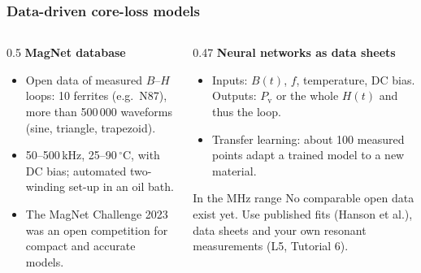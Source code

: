 \begin{frame}
	\frametitle{Data-driven core-loss models}
	\begin{columns}[T]
		\begin{column}{0.5\textwidth}
			\small
			\textbf{MagNet database}
			\begin{itemize}
				\item Open data of measured $B$--$H$ loops: 10 ferrites (e.g.\ N87), more than 500\,000 waveforms (sine, triangle, trapezoid).
				\item 50--500\,kHz, 25--90\,$^\circ$C, with DC bias; automated two-winding set-up in an oil bath.
				\item The MagNet Challenge 2023 was an open competition for compact and accurate models.
			\end{itemize}
		\end{column}
		\begin{column}{0.47\textwidth}
			\small
			\textbf{Neural networks as data sheets}
			\begin{itemize}
				\item Inputs: $B(t)$, $f$, temperature, DC bias. Outputs: $P_\mathrm{v}$ or the whole $H(t)$ and thus the loop.
				\item Transfer learning: about 100 measured points adapt a trained model to a new material.
			\end{itemize}
			\begin{block}{In the MHz range}
				No comparable open data exist yet. Use published fits (Hanson et al.), data sheets and your own resonant measurements (L5, Tutorial 6).
			\end{block}
		\end{column}
	\end{columns}
\end{frame}

